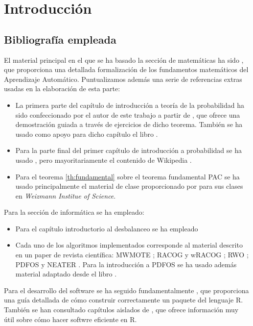 \chapter*{Introducción}

  \section*{Bibliografía empleada}
  El material principal en el que se ha basado la sección de matemáticas ha sido \citep{shalev}, 
  que proporciona una detallada formalización de los fundamentos matemáticos del Aprendizaje Automático. Puntualizamos además
  una serie de referencias extras usadas en la elaboración de esta parte:
  
  \begin{itemize} 
   \item La primera parte del capítulo de introducción a teoría de la probabilidad ha sido confeccionado por el autor de 
   este trabajo a partir de \citep{caratheodory}, que ofrece una demostración guiada a través de ejercicios de dicho teorema. 
   También se ha usado como apoyo para dicho capítulo el libro \citep{loeve}. 
   \item Para la parte final del primer capítulo de introducción a probabilidad se ha usado \citep{shalev}, pero
   mayoritariamente el contenido de Wikipedia \citep{wiki:markov, wiki:hoeff_lemma, wiki:hoeffding}.
   \item Para el teorema \ref{th:fundamental} sobre el teorema fundamental PAC se ha usado principalmente el material de clase
   proporcionado por \citep{slfetaya} para sus clases en \textit{Weizmann Institue of Science}.
  \end{itemize}
   
   Para la sección de informática se ha empleado:
   
  \begin{itemize}
   \item Para el capítulo introductorio al desbalanceo se ha empleado \citep{he2009} 
   \item Cada uno de los algoritmos implementados corresponde al material descrito en un paper de revista científica: 
   MWMOTE \citep{chawla02}; RACOG y wRACOG \citep{das2015}; RWO \citep{zhang2014}; PDFOS \citep{gao2014} y 
   NEATER \citep{almogahed2014}. Para la introducción a PDFOS se ha usado además material adaptado desde el libro \citep{silverman}.
  \end{itemize}

   Para el desarrollo del software se ha seguido fundamentalmente \citep{rhadleypkg}, que proporciona una guía detallada de
   cómo construir correctamente un paquete del lenguaje R. También se han consultado capítulos aislados de \citep{rgillespie},
   que ofrece información muy útil sobre cómo hacer softwre eficiente en R.